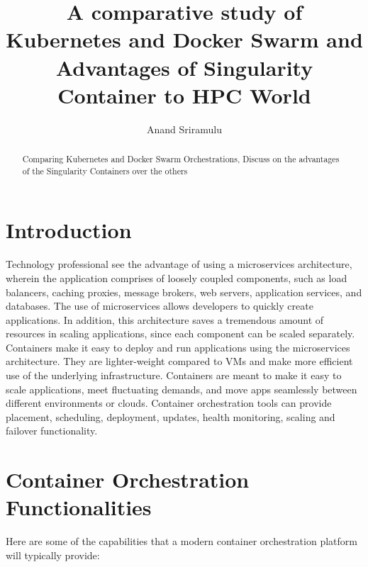 \documentclass[sigconf]{acmart}
\begin{document}
	\title {A comparative study of Kubernetes and Docker Swarm and Advantages of Singularity Container to HPC World}
	
	
	\author{Anand Sriramulu}
	
	
	\renewcommand{\shortauthors}{Anand S}
	
	
	\begin{abstract}
		Comparing Kubernetes and Docker Swarm Orchestrations, Discuss on the advantages of the Singularity Containers over the others
	\end{abstract}
	
	
	\maketitle
	
	\section{Introduction}
	Technology professional see the advantage of using a microservices architecture, wherein the application comprises of loosely coupled
	components, such as load balancers, caching proxies, message brokers, web servers, application services, and databases.
	The use of microservices allows developers to quickly create applications. In addition, this architecture saves a tremendous
	amount of resources in scaling applications, since each component can be scaled separately.
	Containers make it easy to deploy and run applications using the microservices architecture. They are lighter-weight compared
	to VMs and make more efficient use of the underlying infrastructure. Containers are meant to make it easy to scale applications,
	meet fluctuating demands, and move apps seamlessly between different environments or clouds. 
	Container orchestration tools can provide placement, scheduling, deployment, updates, health monitoring, scaling and failover functionality. 
	\cite{Container-Orchestration}	
	\section{Container Orchestration Functionalities }
	Here are some of the capabilities that a modern container orchestration platform will typically provide:
\end{document}

